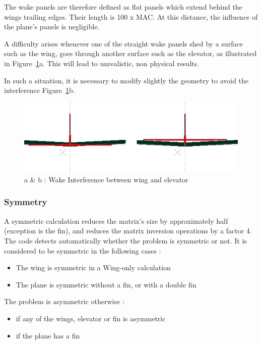 \documentclass[a4paper,twoside,12pt,dvips]{article}
\begin{document}
The wake panels are therefore defined as flat panels which extend
behind the wings trailing edges. Their length is 100 x MAC. At this
distance, the influence of the plane's panels is negligible.

A difficulty arises whenever one of the straight wake panels shed by a
surface such as the wing, goes through another surface such as the
elevator, as illustrated in
Figure~\ref{fig:wake_interference_between_wing_and_elevator}a. This
will lead to unrealistic, non physical results.

In such a situation, it is necessary to modify slightly the geometry
to avoid the interference
Figure~\ref{fig:wake_interference_between_wing_and_elevator}b.

\begin{figure}[htbp]
  \includegraphics[width=0.8\linewidth]{img-14}\centering 
  \caption{a \& b : Wake Interference between wing and elevator}
  \label{fig:wake_interference_between_wing_and_elevator}
\end{figure}

\subsubsection{Symmetry}
\label{sec:symmetry}

A symmetric calculation reduces the matrix's size by approximately
half (exception is the fin), and reduces the matrix inversion
operations by a factor 4. The code detects automatically whether the
problem is symmetric or not. It is considered to be symmetric in the
following cases :

\begin{itemize}
\item The wing is symmetric in a Wing-only calculation
\item The plane is symmetric without a fin, or with a double fin
\end{itemize}

The problem is asymmetric otherwise :

\begin{itemize}
\item if any of the wings, elevator or fin is asymmetric
\item if the plane has a fin
\end{itemize}
\end{document}
